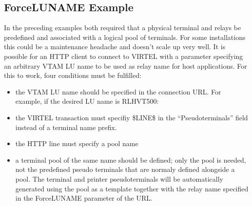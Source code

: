 \documentclass[letterpaper,10pt,english]{sphinxmanual}
\begin{document}
\subsection{ForceLUNAME Example}
\label{\detokenize{connectivity_guide:forceluname-example}}\label{\detokenize{connectivity_guide:index-152}}
\sphinxAtStartPar
In the preceding examples both required that a physical terminal and relays be predefined and associated with a logical pool of terminals. For some installations this could be a maintenance headache and doesn’t scale up very well. It is possible for an HTTP client to connect to VIRTEL with a parameter specifying an arbitrary VTAM LU name to be used as relay name for host applications. For this to work, four conditions must be fulfilled:\sphinxhyphen{}
\begin{itemize}
\item {} 
\sphinxAtStartPar
the VTAM LU name should be specified in the connection URL. For example, if the desired LU name is RLHVT500:

\end{itemize}

\begin{sphinxVerbatim}[commandchars=\\\{\}]
\end{sphinxVerbatim}
\begin{itemize}
\item {} 
\sphinxAtStartPar
the VIRTEL transaction must specifiy \$LINE\$ in the “Pseudo\sphinxhyphen{}terminals” field instead of a terminal name prefix.

\item {} 
\sphinxAtStartPar
the HTTP line must specify a pool name

\item {} 
\sphinxAtStartPar
a terminal pool of the same name should be defined; only the pool is needed, not the predefined pseudo\sphinxhyphen{} terminals that are normaly defined alongside a pool. The terminal and printer pseudo\sphinxhyphen{}terminals will be automatically generated using the pool as a template together with the relay name specified in the ForceLUNAME parameter of the URL.

\end{itemize}
\end{document}
